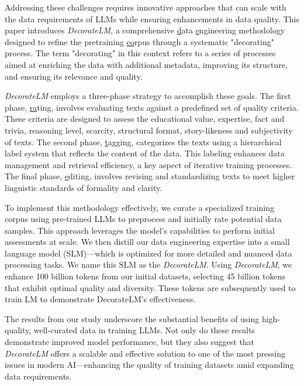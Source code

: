 \documentclass[11pt]{article}
\begin{document}
Addressing these challenges requires innovative approaches that can scale with the data requirements of LLMs while ensuring enhancements in data quality. This paper introduces \textit{DecorateLM}, a comprehensive \underline{d}ata \underline{e}ngineering methodology designed to refine the pretraining \underline{co}rpus through a systematic "decorating" process. The term "decorating" in this context refers to a series of processes aimed at enriching the data with additional metadata, improving its structure, and ensuring its relevance and quality.

\textit{DecorateLM} employs a three-phase strategy to accomplish these goals. The first phase, \underline{ra}ting, involves evaluating texts against a predefined set of quality criteria. 
These criteria are designed to assess the educational value, expertise, fact and trivia, reasoning level, scarcity, structural format, story-likeness and subjectivity of texts.
The second phase, \underline{t}agging, categorizes the texts using a hierarchical label system that reflects the content of the data. This labeling enhances data management and retrieval efficiency, a key aspect of iterative training processes. The final phase, \underline{e}diting, involves revising and standardizing texts to meet higher linguistic standards of formality and clarity.

To implement this methodology effectively, we curate a specialized training corpus using pre-trained LLMs to preprocess and initially rate potential data samples. This approach leverages the model's capabilities to perform initial assessments at scale. We then distill our data engineering expertise into a small language model (SLM)—which is optimized for more detailed and nuanced data processing tasks. We name this SLM as the \textit{DecorateLM}. Using \textit{DecorateLM}, we enhance 100 billion tokens from our initial datasets, selecting 45 billion tokens that exhibit optimal quality and diversity. These tokens are subsequently used to train LM to demonstrate DecorateLM's effectiveness.

The results from our study underscore the substantial benefits of using high-quality, well-curated data in training LLMs. Not only do these results demonstrate improved model performance, but they also suggest that \textit{DecorateLM} offers a scalable and effective solution to one of the most pressing issues in modern AI—enhancing the quality of training datasets amid expanding data requirements. 
\end{document}
